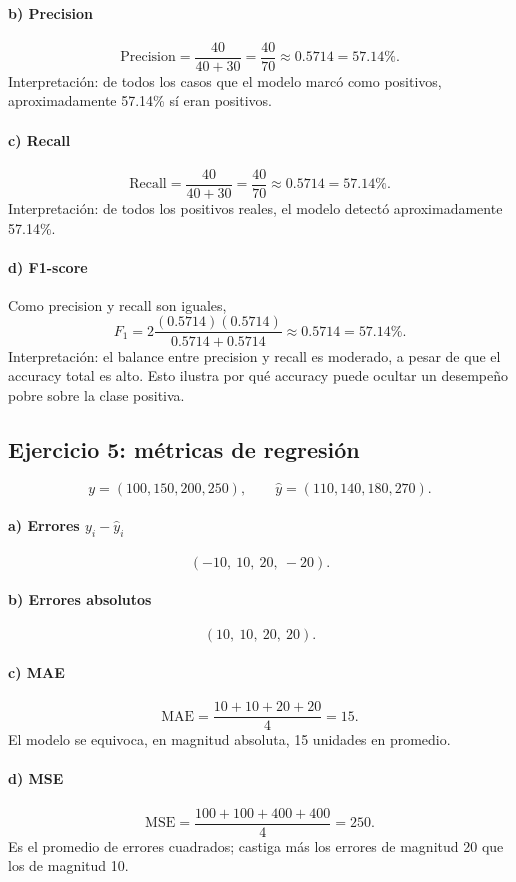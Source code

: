 \documentclass[11pt]{article}
\begin{document}
\paragraph{b) Precision}
\[
\mathrm{Precision}=\frac{40}{40+30}=\frac{40}{70}\approx0.5714=57.14\%.
\]
Interpretación: de todos los casos que el modelo marcó como positivos, aproximadamente 57.14\% sí eran positivos.

\paragraph{c) Recall}
\[
\mathrm{Recall}=\frac{40}{40+30}=\frac{40}{70}\approx0.5714=57.14\%.
\]
Interpretación: de todos los positivos reales, el modelo detectó aproximadamente 57.14\%.

\paragraph{d) F1-score}
Como precision y recall son iguales,
\[
F_1=2\frac{(0.5714)(0.5714)}{0.5714+0.5714}\approx0.5714=57.14\%.
\]
Interpretación: el balance entre precision y recall es moderado, a pesar de que el accuracy total es alto. Esto ilustra por qué accuracy puede ocultar un desempeño pobre sobre la clase positiva.

\subsection{Ejercicio 5: métricas de regresión}
\[
y=(100,150,200,250),\qquad \hat y=(110,140,180,270).
\]

\paragraph{a) Errores $y_i-\hat y_i$}
\[
(-10,\ 10,\ 20,\ -20).
\]

\paragraph{b) Errores absolutos}
\[
(10,\ 10,\ 20,\ 20).
\]

\paragraph{c) MAE}
\[
\mathrm{MAE}=\frac{10+10+20+20}{4}=15.
\]
El modelo se equivoca, en magnitud absoluta, 15 unidades en promedio.

\paragraph{d) MSE}
\[
\mathrm{MSE}=\frac{100+100+400+400}{4}=250.
\]
Es el promedio de errores cuadrados; castiga más los errores de magnitud 20 que los de magnitud 10.
\end{document}
